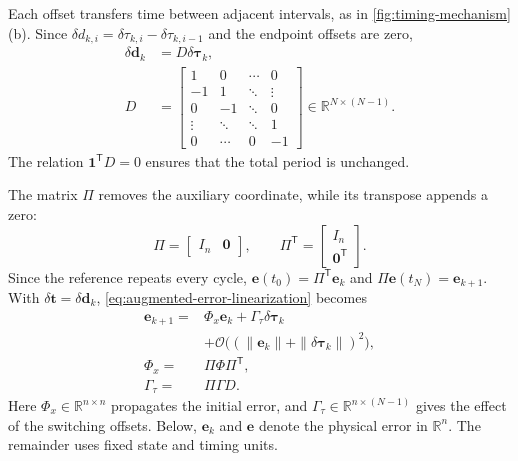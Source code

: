 \documentclass[pdflatex,iicol,sn-mathphys-ay]{sn-jnl}
\newcommand{\R}{\mathbb{R}}
\newcommand{\vect}[1]{\bm{#1}}
\newcommand{\dtau}{\delta\vect{\tau}}
\newcommand{\ddwell}{\delta\vect{d}}
\begin{document}
Each offset transfers time between adjacent intervals, as in \cref{fig:timing-mechanism}(b). Since $\delta d_{k,i}=\delta\tau_{k,i}-\delta\tau_{k,i-1}$ and the endpoint offsets are zero,
\begin{equation}
\begin{aligned}
    \ddwell_k&=D\dtau_k,\\
    D&=\begin{bmatrix}
         1 & 0 & \cdots & 0\\
        -1 & 1 & \ddots & \vdots\\
         0 & -1 & \ddots & 0\\
         \vdots & \ddots & \ddots & 1\\
         0 & \cdots & 0 & -1
    \end{bmatrix}
    \in\R^{N\times(N-1)}.
\end{aligned}
\label{eq:incidence-map}
\end{equation}
The relation $\vect{1}^{\mathsf T}D=0$ ensures that the total period is unchanged.

The matrix $\Pi$ removes the auxiliary coordinate, while its transpose appends a zero:
\begin{equation}
    \Pi=\begin{bmatrix}I_n&\vect{0}\end{bmatrix},\qquad
    \Pi^{\mathsf T}=\begin{bmatrix}I_n\\\vect{0}^{\mathsf T}\end{bmatrix}.
\end{equation}
Since the reference repeats every cycle, $\vect{e}(t_0)=\Pi^{\mathsf T}\vect{e}_k$ and $\Pi\vect{e}(t_N)=\vect{e}_{k+1}$. With $\delta\vect{t}=\ddwell_k$, \eqref{eq:augmented-error-linearization} becomes
\begin{equation}
\begin{aligned}
    \vect{e}_{k+1}={}&\Phi_x\vect{e}_k+\Gamma_\tau\dtau_k\\
    &+\mathcal O\bigl((\|\vect{e}_k\|+\|\dtau_k\|)^2\bigr),\\
    \Phi_x={}&\Pi\Phi\Pi^{\mathsf T},\\
    \Gamma_\tau={}&\Pi\Gamma D.
\end{aligned}
\label{eq:cycle-model}
\end{equation}
Here $\Phi_x\in\R^{n\times n}$ propagates the initial error, and $\Gamma_\tau\in\R^{n\times(N-1)}$ gives the effect of the switching offsets. Below, $\vect{e}_k$ and $\vect{e}$ denote the physical error in $\R^n$. The remainder uses fixed state and timing units.
\end{document}
